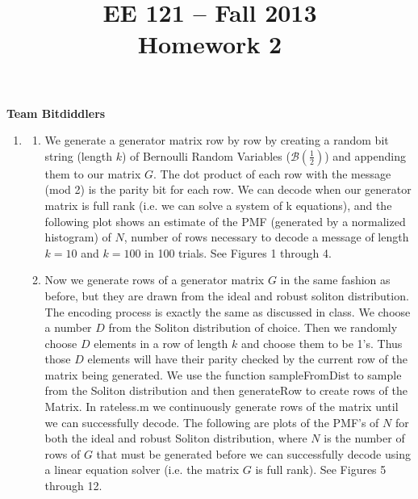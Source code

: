 \documentclass[11pt]{article}
\title{EE 121 -- Fall 2013\\Homework 2}
\begin{document}
\maketitle
\noindent\textbf{Team Bitdiddlers} \\

\begin{enumerate}


  \item
    \begin{enumerate}


        \item We generate a generator matrix row by row by creating a random bit string (length $k$) of Bernoulli Random Variables ($\mathcal{B}(\frac{1}{2})$) and appending them to our matrix $G$. The dot product of each row with the message (mod 2) is the parity bit for each row. We can decode when our generator matrix is full rank (i.e. we can solve a system of k equations), and the following plot shows an estimate of the PMF (generated by a normalized histogram) of $N$, number of rows necessary to decode a message of length $k=10$ and $k=100$ in 100 trials. See Figures 1 through 4.


        \item Now we generate rows of a generator matrix $G$ in the same fashion as before, but they are drawn from the ideal and robust soliton distribution. The encoding process is exactly the same as discussed in class. We choose a number $D$ from the Soliton distribution of choice. Then we randomly choose $D$ elements in a row of length $k$ and choose them to be 1's. Thus those $D$ elements will have their parity checked by the current row of the matrix being generated. We use the function sampleFromDist to sample from the Soliton distribution and then generateRow to create rows of the Matrix. In rateless.m we continuously generate rows of the matrix until we can successfully decode. The following are plots of the PMF's of $N$ for both the ideal and robust Soliton distribution, where $N$ is the number of rows of $G$ that must be generated before we can successfully decode using a linear equation solver (i.e. the matrix $G$ is full rank). See Figures 5 through 12.




\end{enumerate}
\end{enumerate}
\end{document}
